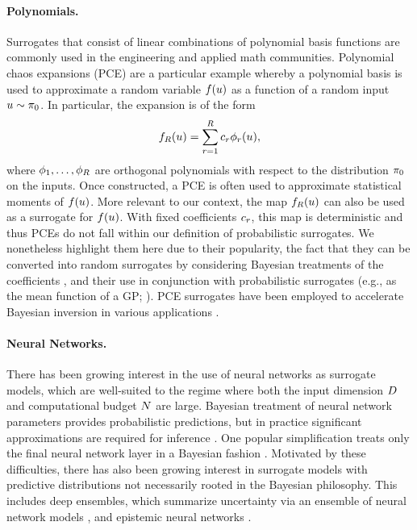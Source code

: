 \documentclass[12pt]{article}
\begin{document}
\paragraph{Polynomials.}
Surrogates that consist of linear combinations of polynomial basis functions are 
commonly used in the engineering and applied math communities. Polynomial 
chaos expansions (PCE) are a particular example whereby a polynomial 
basis is used to approximate a random variable $\func(\Par)$ as a function of
a random input $\Par \sim \priorDens$. In particular, the expansion is of the form
\begin{equation}
\funcEm[\dimBasis](\Par) = \sum_{\idxBasis=1}^{\dimBasis} c_{\idxBasis} \basisVec_{\idxBasis}(\Par),
\end{equation}
where $\basisVec_{1}, \dots, \basisVec_{\dimBasis}$ are orthogonal polynomials with respect 
to the distribution $\priorDens$ on the inputs. Once constructed, a PCE is often used to 
approximate statistical moments of $\func(\Par)$. More relevant to our context,
the map $\funcEm[\dimBasis](\Par)$ can also be used as a surrogate for $\func(\Par)$.
With fixed coefficients $c_{\idxBasis}$, this map is deterministic and thus PCEs do not fall
within our definition of probabilistic surrogates. We nonetheless highlight them here
due to their popularity, the fact that they can be converted into random surrogates by 
considering Bayesian treatments of the coefficients 
\citep{BayesianPCE1,BayesianPCE2,BurknerSurrogate},
and their use in conjunction with probabilistic surrogates (e.g., as the mean function
of a GP; \citet{PCEGPWind,PCEGP2,SinsbeckNowak}). PCE surrogates have been
employed to accelerate Bayesian inversion in various applications 
\citep{dimRedPolyChaos,BurknerSurrogate,PCEBIP}.

\paragraph{Neural Networks.}
There has been growing interest in the use of neural networks as surrogate models, 
which are well-suited to the regime where both the input dimension $\dimPar$ 
and computational budget $\Ndesign$ are large. Bayesian treatment of neural 
network parameters provides probabilistic predictions, but in practice significant 
approximations are required for inference \citep{BayesOptNN}. One popular simplification
treats only the final neural network layer in a Bayesian fashion 
\citep{BayesLastLayer,BayesOptBayesLastLayer}. Motivated by these difficulties,
there has also been growing interest in surrogate models with predictive distributions 
not necessarily rooted in the Bayesian philosophy. This includes deep ensembles, 
which summarize uncertainty via an ensemble of neural network 
models \citep{deepEnsembles}, and epistemic neural networks \citep{epistemicNN,BayesOptEpistemicNN}. 
\end{document}
